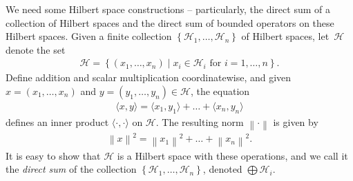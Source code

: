 \documentclass[11pt,a4paper]{report}
\theoremstyle{plain}
\theoremstyle{definition}
\newcommand{\1}{\mathbbm{1}}
\renewcommand{\H}{\mathcal{H}}
\renewcommand{\oplus}{\textstyle\bigoplus}
\begin{document}
We need some Hilbert space constructions -- particularly, the direct sum of a 
collection of Hilbert spaces and the direct sum of bounded operators on these 
Hilbert spaces. Given a finite collection $\left\{\H_1,\dots,\H_n\right\}$ of Hilbert 
spaces, let~$\H$ denote the set
\begin{align*}
	\H  = \left\{(x_1,\dots,x_n) \mid x_i \in \H_i \mbox { for } i=1,\dots,n \right\}.
\end{align*}
Define addition and scalar multiplication coordinatewise, and given $x=(x_1,\dots,x_n)$ and $y=(y_1,\dots,y_n) \in \H$, the equation
\begin{align*}
	\langle x,y\rangle = \langle x_1,y_1\rangle + \dots + \langle x_n,y_n \rangle
\end{align*}
defines an inner product $\langle\cdot,\cdot\rangle$ on $\H$. The resulting norm $\left\|\cdot\right\|$ is given by
\begin{align*}
	\left\|x\right\|^2 = \left\|x_1\right\|^2 + \dots + \left\|x_n\right\|^2.
\end{align*}
It is easy to show that $\H$ is a Hilbert space with these operations, and we call it the \emph{direct sum} of the collection $\left\{\H_1,\dots,\H_n\right\}$, denoted $\oplus\H_i$.
\end{document}
